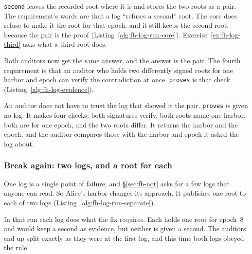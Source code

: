 
\texttt{second} leaves the recorded root where it is and stores the two
roots as a pair. The requirement's words are that a log ``refuses a
second'' root. The core does refuse to make it the root for that epoch,
and it still keeps the second root, because the pair is the proof
(Listing~\ref{alg:fh-log-run-core}). Exercise~\ref{ex:fh-log-third} asks
what a third root does.


Both auditors now get the same answer, and the answer is the pair. The
fourth requirement is that an auditor who holds two differently signed
roots for one harbor and epoch can verify the contradiction at once.
\texttt{proves} is that check (Listing~\ref{alg:fh-log-evidence}).


An auditor does not have to trust the log that showed it the pair.
\texttt{proves} is given no log. It makes four checks: both signatures
verify, both roots name one harbor, both are for one epoch, and the two
roots differ. It returns the harbor and the epoch, and the auditor
compares those with the harbor and epoch it asked the log about.

\subsubsection{Break again: two logs, and a root for each}

One log is a single point of failure, and \S\ref{sec:fh-not} asks for a
few logs that anyone can read. So Alice's harbor changes its approach. It
publishes one root to each of two logs
(Listing~\ref{alg:fh-log-run-separate}).

In that run each log does what the fix requires. Each holds one root for
epoch~8 and would keep a second as evidence, but neither is given a
second. The auditors end up split exactly as they were at the first log,
and this time both logs obeyed the rule.

